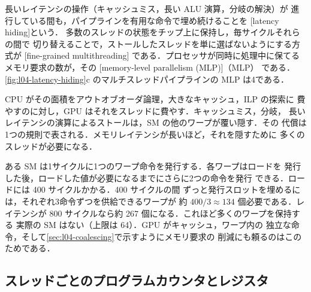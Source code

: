 \documentclass[../main.tex]{subfiles}
\begin{document}
\begin{definition}[マルチスレッディングによるレイテンシ隠蔽]
  \label{def:l04-latency-hiding}
  長いレイテンシの操作（キャッシュミス，長い ALU 演算，分岐の解決）が
  進行している間も，パイプラインを有用な命令で埋め続けることを
  [latency hiding]という．
  多数のスレッドの状態をチップ上に保持し，毎サイクルそれらの間で
  切り替えることで，ストールしたスレッドを単に選ばないようにする方式が
  [fine-grained multithreading]
  である．プロセッサが同時に処理中に保てるメモリ要求の数が，その
  [memory-level parallelism (MLP)]（MLP）
  である．\cref{fig:l04-latency-hiding}c のマルチスレッドパイプラインの
  MLP は4である．
\end{definition}

CPU がその面積をアウトオブオーダ論理，大きなキャッシュ，ILP の探索に
費やすのに対し，GPU はそれをスレッドに費やす．キャッシュミス，分岐，
長いレイテンシの演算によるストールは，SM の他のワープが覆い隠す．その
代償は1つの規則で表される．メモリレイテンシが長いほど，それを隠すために
多くのスレッドが必要になる．

\begin{example}
  \label{ex:l04-threads-needed}
  ある SM は1サイクルに1つのワープ命令を発行する．各ワープはロードを
  発行した後，ロードした値が必要になるまでにさらに2つの命令を発行
  できる．ロードには \num{400} サイクルかかる．\num{400} サイクルの間
  ずっと発行スロットを埋めるには，それぞれ3命令ずつを供給できるワープが
  約 $400 / 3 \approx 134$ 個必要である．レイテンシが \num{800}
  サイクルなら約 \num{267} 個になる．これほど多くのワープを保持する
  実際の SM はない（上限は \num{64}）．GPU がキャッシュ，ワープ内の
  独立な命令，そして\cref{sec:l04-coalescing}で示すようにメモリ要求の
  削減にも頼るのはこのためである．
\end{example}

\subsection{スレッドごとのプログラムカウンタとレジスタ}
\end{document}
